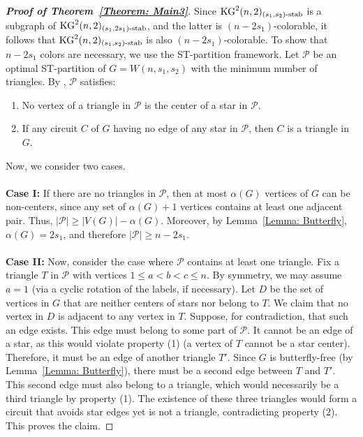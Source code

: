 \documentclass[preprint,12pt,3p]{elsarticle}
\begin{document}
\begin{proof}[\textbf{Proof of Theorem~\ref{Theorem: Main3}}]
Since $\mathrm{KG}^{2}(n, 2)_{(s_1,s_2)\textup{-stab}}$ is a subgraph of $\mathrm{KG}^{2}(n, 2)_{(s_1,2s_1)\textup{-stab}}$, and the latter is $(n-2s_1)$-colorable, it follows that $\mathrm{KG}^{2}(n, 2)_{(s_1,s_2)\textup{-stab}}$ is also $(n-2s_1)$-colorable. To show that $n-2s_1$ colors are necessary, we use the ST-partition framework. Let $\mathcal{P}$ be an optimal ST-partition of $G = W(n, s_1, s_2)$ with the minimum number of triangles. By \cite[Lemma 1]{daneshpajouh2021colorings}, $\mathcal{P}$ satisfies:
\begin{enumerate}
    \item[(1)] No vertex of a triangle in $\mathcal{P}$ is the center of a star in $\mathcal{P}$.
    \item[(2)] If any circuit $C$ of $G$ having no edge of
any star in $\mathcal{P}$, then $C$ is a triangle in $G$.
\end{enumerate}
Now, we consider two cases.
\\~\\
\noindent\textbf{Case I:} If there are no triangles in $\mathcal{P}$, then at most $\alpha(G)$ vertices of $G$ can be non-centers, since any set of $\alpha(G)+1$ vertices contains at least one adjacent pair. Thus, $|\mathcal{P}| \geq |V(G)| - \alpha(G)$. Moreover, by Lemma~\ref{Lemma: Butterfly}, $\alpha(G) = 2s_1$, and therefore $|\mathcal{P}| \geq n - 2s_1$.
\\~\\
\noindent\textbf{Case II:} Now, consider the case where $\mathcal{P}$ contains at least one triangle. Fix a triangle $T$ in $\mathcal{P}$ with vertices $1 \leq a < b < c \leq n$. By symmetry, we may assume $a = 1$ (via a cyclic rotation of the labels, if necessary). Let $D$ be the set of vertices in $G$ that are neither centers of stars nor belong to $T$. We claim that no vertex in $D$ is adjacent to any vertex in $T$. Suppose, for contradiction, that such an edge exists. This edge must belong to some part of $\mathcal{P}$. It cannot be an edge of a star, as this would violate property (1) (a vertex of $T$ cannot be a star center). Therefore, it must be an edge of another triangle $T'$. Since $G$ is butterfly-free (by Lemma~\ref{Lemma:  Butterfly}), there must be a second edge between $T$ and $T'$. This second edge must also belong to a triangle, which would necessarily be a third triangle by property (1). The existence of these three triangles would form a circuit that avoids star edges yet is not a triangle, contradicting property (2). This proves the claim.


\end{proof}
\end{document}
